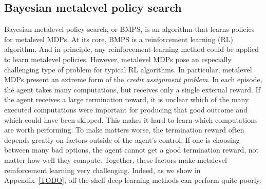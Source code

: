 \subsection{Bayesian metalevel policy search}\label{sec:BMPS}

Bayesian metalevel policy search, or BMPS, is an algorithm that learns policies for metalevel MDPs. At its core, BMPS is a reinforcement learning (RL) algorithm. And in principle, any reinforcement-learning method could be applied to learn metalevel policies. However, metalevel MDPs pose an especially challenging type of problem for typical RL algorithms. In particular, metalevel MDPs present an extreme form of the \emph{credit assignment problem}. In each episode, the agent takes many computations, but receives only a single external reward. If the agent receives a large termination reward, it is unclear which of the many executed computations were important for producing that good outcome and which could have been skipped. This makes it hard to learn which computations are worth performing. To make matters worse, the termination reward often depends greatly on factors outside of the agent's control. If one is choosing between many bad options, the agent cannot get a good termination reward, not matter how well they compute. Together, these factors make metalevel reinforcement learning very challenging. Indeed, as we show in Appendix~\ref{TODO}, off-the-shelf deep learning methods can perform quite poorly.

